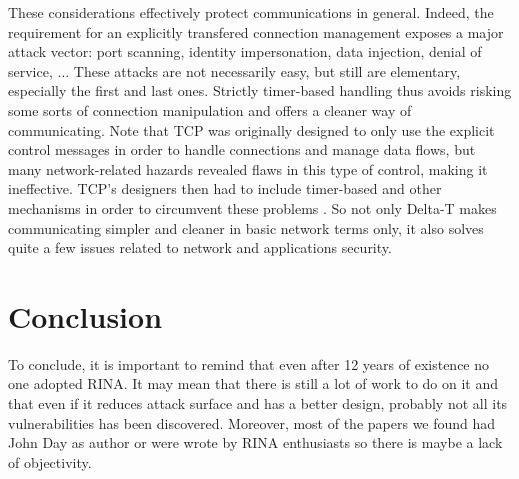 \documentclass[a4paper]{proc}
\begin{document}
These considerations effectively protect communications in general. Indeed, the
requirement for an explicitly transfered connection management exposes a major
attack vector: port scanning, identity impersonation, data injection, denial of
service, ... These attacks are not necessarily easy, but still are elementary,
especially the first and last ones. Strictly timer-based handling thus avoids
risking some sorts of connection manipulation and offers a cleaner way of
communicating. Note that TCP was originally designed to only use the explicit
control messages in order to handle connections and manage data flows, but many
network-related hazards revealed flaws in this type of control, making it
ineffective. TCP's designers then had to include timer-based and other
mechanisms in order to circumvent these problems \cite{delta-t}. So not only
Delta-T makes communicating simpler and cleaner in basic network terms only, it
also solves quite a few issues related to network and applications security.

\part{Conclusion}
To conclude, it is important to remind that even after 12 years of existence
no one adopted RINA. It may mean that there is still a lot of work to do on 
it and that even if it reduces attack surface and has a better design,
probably not all its vulnerabilities has been discovered. \newline
Moreover, most of the papers we found had John Day as author or were
wrote by RINA enthusiasts so there is maybe a lack of objectivity.

\nocite{*}
\newpage


\end{document}
